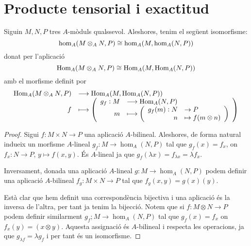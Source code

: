 \documentclass[../../../main.tex]{subfiles}
\begin{document}
\section{Producte tensorial i exactitud}



\begin{prop}
\label{prop:producteTensorialHom}
Siguin $M,N,P$ tres $A$-mòduls qualssevol. Aleshores, tenim el següent isomorfisme:
\begin{equation}
    \notag
    \hom_A(M\otimes_AN,P)\cong \hom_A(M,\hom_A(N,P))
\end{equation}
donat per l'aplicació
\begin{equation}
    \notag
    \operatorname{Hom}_A(M\otimes_AN,P)\cong \operatorname{Hom}_A(M,\operatorname{Hom}_A(N,P))
\end{equation}
amb el morfisme definit por 
\begin{equation}
    \notag
    \begin{array}{rl}
        \operatorname{Hom}_A(M\otimes_AN,P) & \longrightarrow\operatorname{Hom}_A(M,\operatorname{Hom}_A(N,P)) \\
        f & \longmapsto\left(\begin{array}{rl}
            g_f:M & \longrightarrow \operatorname{Hom}_A(N,P) \\
            m & \longmapsto \left(\begin{array}{rl}
                g_f(m):N & \rightarrow P \\
                n & \mapsto f(m\otimes n)
            \end{array}\right)
        \end{array}\right)
    \end{array}
\end{equation}
\end{prop}
\begin{proof}
Sigui $f:M\times N\to P$ una aplicació $A$-bilineal. Aleshores, de forma natural indueix un morfisme $A$-lineal $g_f:M\to \hom_A(N,P)$ tal que $g_f(x) = f_x$, on $f_x:N\to P$, $y\mapsto f(x,y)$. És $A$-lineal ja que $g_f(\lambda x) = f_{\lambda x} = \lambda f_x$.

Inversament, donada una aplicació $A$-lineal $g:M\to \hom_A(N,P)$ podem definir una aplicació $A$-bilineal $f_g:M\times N\to P$ tal que $f_g(x,y) = g(x)(y)$. 

Està clar que hem definit una correspondència bijectiva i una aplicació és la inversa de l'altra, per tant ja tenim la bijecció. Notem que si $f:M\otimes N\to P$ podem definir similarment $g_f;M\to \hom_A(N,P)$ tal que $g_f(x) = f_x$ on $f_x(y) = (x\otimes y)$. Aquesta assignació és $A$-bilineal i respecta les operacions, ja que $g_{\lambda f} = \lambda g_f$ i per tant és un isomorfisme.
\end{proof}
\end{document}
